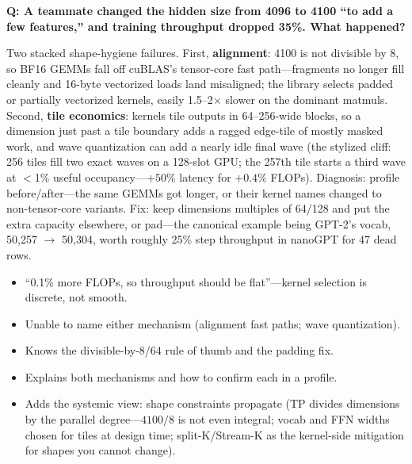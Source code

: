 \begin{interviewq}
\textbf{Q: A teammate changed the hidden size from 4096 to 4100 ``to add a few features,'' and training throughput dropped 35\%. What happened?}

 \quad {} \quad \badgefreq{\freqlow}

\stronganswer Two stacked shape-hygiene failures. First, \textbf{alignment}: 4100 is not divisible by 8, so BF16 GEMMs fall off cuBLAS's tensor-core fast path---fragments no longer fill cleanly and 16-byte vectorized loads land misaligned; the library selects padded or partially vectorized kernels, easily 1.5--2$\times$ slower on the dominant matmuls. Second, \textbf{tile economics}: kernels tile outputs in 64--256-wide blocks, so a dimension just past a tile boundary adds a ragged edge-tile of mostly masked work, and wave quantization can add a nearly idle final wave (the stylized cliff: 256 tiles fill two exact waves on a 128-slot GPU; the 257th tile starts a third wave at $<$1\% useful occupancy---$+50\%$ latency for $+0.4\%$ FLOPs). Diagnosis: profile before/after---the same GEMMs got longer, or their kernel names changed to non-tensor-core variants. Fix: keep dimensions multiples of 64/128 and put the extra capacity elsewhere, or pad---the canonical example being GPT-2's vocab, 50{,}257 $\to$ 50{,}304, worth roughly 25\% step throughput in nanoGPT for 47 dead rows.

\redflags
\begin{itemize}
    \item ``0.1\% more FLOPs, so throughput should be flat''---kernel selection is discrete, not smooth.
    \item Unable to name either mechanism (alignment fast paths; wave quantization).
\end{itemize}

\goodgreat
\begin{itemize}
    \item {} Knows the divisible-by-8/64 rule of thumb and the padding fix.
    \item {} Explains both mechanisms and how to confirm each in a profile.
    \item {} Adds the systemic view: shape constraints propagate (TP divides dimensions by the parallel degree---$4100/8$ is not even integral; vocab and FFN widths chosen for tiles at design time; split-K/Stream-K as the kernel-side mitigation for shapes you cannot change).
\end{itemize}

\end{interviewq}

